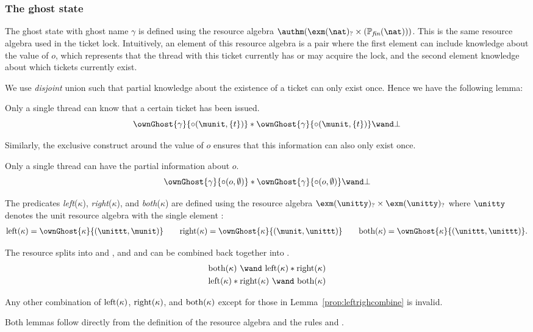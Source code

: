 \subsubsection{The ghost state}

The ghost state with ghost name $\gamma$ is defined using the resource algebra
$\authm(\exm(\nat)_{?} \times (\mathbb{P}_{\textit{fin}}(\nat)))$. This is the
same resource algebra used in the ticket lock. Intuitively, an element of this
resource algebra is a pair where the first element can include knowledge about
the value of $o$, which represents that the thread with this ticket currently
has or may acquire the lock, and the second element knowledge about which tickets currently
exist.

We use \emph{disjoint} union such that partial knowledge about the existence
of a ticket can only exist once. Hence we have the following lemma:
\begin{lemma} \label{prop:issuedcontra}
  Only a single thread can know that a certain ticket has been issued.
  \[ \ownGhost{\gamma}{\circ(\munit, \{ t \})} \ast \ownGhost{\gamma}{\circ(\munit, \{ t \})} \wand \bot \]
\end{lemma}
Similarly, the exclusive construct around the value of $o$ ensures that this information can also only exist once.
\begin{lemma} \label{prop:knowocontra}
  Only a single thread can have the partial information about $o$.
  \[ \ownGhost{\gamma}{\circ(o, \emptyset)} \ast \ownGhost{\gamma}{\circ(o, \emptyset)} \wand \bot \]
\end{lemma}

The predicates \textit{left}($\kappa$), \textit{right}($\kappa$), and \textit{both}($\kappa$)
are defined using the
resource algebra $\exm(\unitty)_{?} \times \exm(\unitty)_{?}$ where $\unitty$ denotes
the unit resource algebra with the single element \unittt:
\begin{align*}
    \leftK = \ownGhost{\kappa}{(\unittt, \munit)} \quad \quad
    \rightK = \ownGhost{\kappa}{(\munit, \unittt)} \quad \quad
    \bothK = \ownGhost{\kappa}{(\unittt, \unittt)} .
\end{align*}

\begin{lemma} \label{prop:leftrighcombine}
The resource \bothK splits into \leftK and \rightK, and \leftK and \rightK can be combined back together into \bothK.
\begin{align*}
  \bothK \ \wand \ \leftK \ast \rightK \\
  \leftK \ast \rightK \  \wand \ \bothK
\end{align*}
\end{lemma}
\begin{lemma} \label{prop:bothnocombine} Any other combination of $\text{left}(\kappa)$,
  $\text{right}(\kappa)$, and $\text{both}(\kappa)$ except for those in Lemma~\ref{prop:leftrighcombine}
  is invalid.
\end{lemma}
Both lemmas follow directly from the definition of the resource algebra and the
rules  and .

